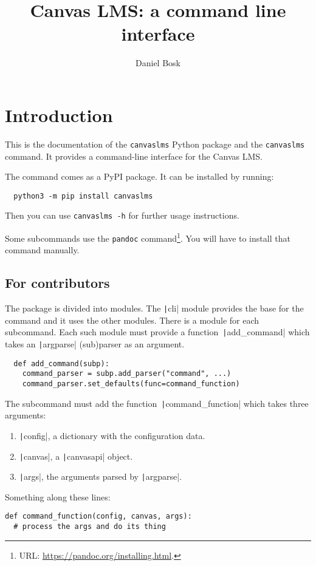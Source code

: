 \documentclass[a4paper,oneside]{book}
\title{%
  Canvas LMS: a command line interface
}
\author{%
  Daniel Bosk
}
\affil{%
  KTH EECS
}
\newenvironment{abstract}{}{}
\begin{document}
\frontmatter
\maketitle

\vspace*{\fill}
\clearpage

\begin{abstract}
  
\end{abstract}
\clearpage


\tableofcontents
\clearpage

\mainmatter


\chapter{Introduction}

This is the documentation of the \texttt{canvaslms} Python package and the 
\texttt{canvaslms} command.
It provides a command-line interface for the Canvas LMS\@.

The command comes as a PyPI package.
It can be installed by running:
\begin{verbatim}
  python3 -m pip install canvaslms
\end{verbatim}
Then you can use \texttt{canvaslms -h} for further usage instructions.

Some subcommands use the \texttt{pandoc} command\footnote{%
  URL: \url{https://pandoc.org/installing.html}.
}.
You will have to install that command manually.


\section{For contributors}

The package is divided into modules.
The \texttt|cli| module provides the base for the command and it uses the 
other modules.
There is a module for each subcommand.
Each such module must provide a function~\texttt|add_command| which takes 
an \texttt|argparse| (sub)parser as an argument.
\begin{verbatim}
  def add_command(subp):
    command_parser = subp.add_parser("command", ...)
    command_parser.set_defaults(func=command_function)
\end{verbatim}
The subcommand must add the function~\texttt|command_function| which 
takes three arguments:
\begin{enumerate}
  \item \texttt|config|, a dictionary with the configuration data.
  \item \texttt|canvas|, a \texttt|canvasapi| object.
  \item \texttt|args|, the arguments parsed by 
    \texttt|argparse|.
\end{enumerate}
Something along these lines:
\begin{verbatim}
def command_function(config, canvas, args):
  # process the args and do its thing
\end{verbatim}
\end{document}
